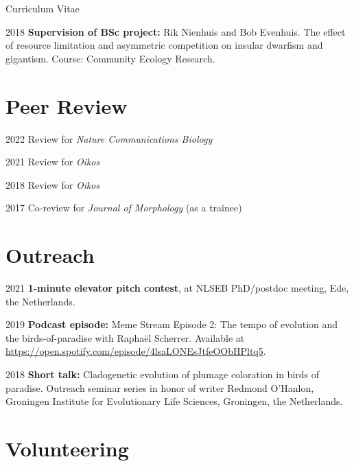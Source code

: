 \documentclass[11pt,a4paper]{article}
\begin{document}
\begin{cv}{Curriculum Vitae}
\begin{cvlist}{}
			\item[2018] \textbf{Supervision of BSc project:} Rik Nienhuis and Bob Evenhuis. The effect of resource limitation and asymmetric competition on insular dwarfism and gigantism. Course: Community Ecology Research.		
			
		\end{cvlist}
		
		\section{Peer Review}
		
		\begin{cvlist}{}
		\item[2022] Review for \textit{Nature Communications Biology}
		\item[2021] Review for \textit{Oikos}
		\item[2018] Review for \textit{Oikos}
		\item[2017] Co-review for \textit{Journal of Morphology} (as a trainee)
		\end{cvlist}
		
		\section{Outreach}
		
		\begin{cvlist}{}
			
			\item[2021] \textbf{1-minute elevator pitch contest}, at NLSEB PhD/postdoc meeting, Ede, the Netherlands.
			
			\item[2019] \textbf{Podcast episode:} Meme Stream Episode 2: The tempo of evolution and the birds-of-paradise with Raphaël Scherrer. Available at \url{https://open.spotify.com/episode/4lsaLONEsJtfeOObHPltq5}.
			
			\item[2018] \textbf{Short talk:} Cladogenetic evolution of plumage coloration in birds of paradise. Outreach seminar series in honor of writer Redmond O'Hanlon, Groningen Institute for Evolutionary Life Sciences, Groningen, the Netherlands.
	
		\end{cvlist}
		
		\section{Volunteering}
		

\end{cv}
\end{document}

